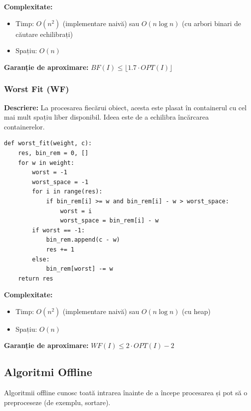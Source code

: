 \documentclass[runningheads]{llncs}
\begin{document}
\textbf{Complexitate:}
\begin{itemize}
    \item Timp: $O(n^2)$ (implementare naivă) sau $O(n \log n)$ (cu arbori binari de căutare echilibrați)
    \item Spațiu: $O(n)$
\end{itemize}

\textbf{Garanție de aproximare:} $BF(I) \leq \lfloor 1.7 \cdot OPT(I) \rfloor$ \cite{dosa2007tight}

\subsubsection{Worst Fit (WF)}

\textbf{Descriere:} La procesarea fiecărui obiect, acesta este plasat în containerul cu cel mai mult spațiu liber disponibil. Ideea este de a echilibra încărcarea containerelor.

\begin{tcolorbox}[BoxRed, title=\faIcon{code} Implementare Worst Fit (Python), fonttitle=\bfseries]
\begin{lstlisting}
def worst_fit(weight, c):
    res, bin_rem = 0, []
    for w in weight:
        worst = -1
        worst_space = -1
        for i in range(res):
            if bin_rem[i] >= w and bin_rem[i] - w > worst_space:
                worst = i
                worst_space = bin_rem[i] - w
        if worst == -1:
            bin_rem.append(c - w)
            res += 1
        else:
            bin_rem[worst] -= w
    return res
\end{lstlisting}
\end{tcolorbox}

\textbf{Complexitate:}
\begin{itemize}
    \item Timp: $O(n^2)$ (implementare naivă) sau $O(n \log n)$ (cu heap)
    \item Spațiu: $O(n)$
\end{itemize}

\textbf{Garanție de aproximare:} $WF(I) \leq 2 \cdot OPT(I) - 2$

\subsection{Algoritmi Offline}

Algoritmii offline cunosc toată intrarea înainte de a începe procesarea și pot să o preproceseze (de exemplu, sortare).
\end{document}
